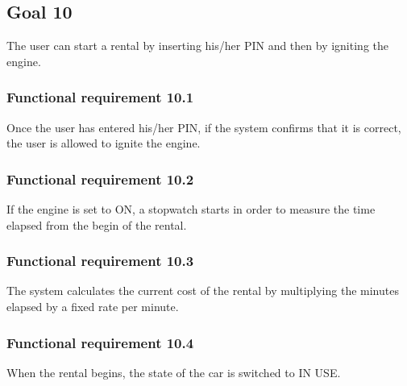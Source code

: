 \subsection{Goal 10}
The user can start a rental by inserting his/her PIN and then by igniting the engine.

\setcounter{secnumdepth}{3}
\subsubsection{Functional requirement 10.1}
Once the user has entered his/her PIN, if the system confirms that it is correct, the user is allowed to ignite the engine.

\subsubsection{Functional requirement 10.2}
If the engine is set to ON, a stopwatch starts in order to measure the time elapsed from the begin of the rental.

\subsubsection{Functional requirement 10.3}
The system calculates the current cost of the rental by multiplying the minutes elapsed by a fixed rate per minute.

\subsubsection{Functional requirement 10.4}
When the rental begins, the state of the car is switched to IN USE.

